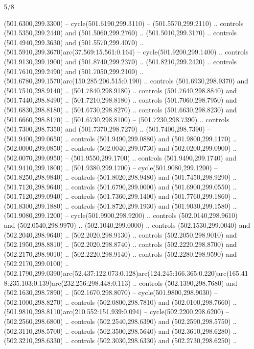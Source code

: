 \begin{flagdescription}{5/8}
\begin{scope}[xshift=0.5\flaglength,yshift=0.5\flagwidth,scale=\flagwidth/475.63]
\begin{scope}[y=0.8pt, x=0.8pt, yscale=-1, xscale=1,shift={(-450,-300)}]
\begin{scope}[cm={{1.0,0.0,0.0,1.0,(-0.0002,0.12556)}},cm={{1.0,0.0,0.0,1.0,(0.00179,0.0)}}]
\begin{scope}[cm={{1.11592,0.0,0.0,1.11592,(-106.89933,-41.77764)}}]
\begin{scope}[draw=black,fill=cfff]
\begin{scope}[fill=black]
  (501.6300,299.3300) -- cycle(501.6190,299.3110) -- (501.5570,299.2110) ..
  controls (501.5350,299.2440) and (501.5060,299.2760) .. (501.5010,299.3170) ..
  controls (501.4940,299.3630) and (501.5570,299.4070) ..
  (501.5910,299.3670)arc(37.569:15.561:0.164) -- cycle(501.9200,299.1400) ..
  controls (501.9130,299.1900) and (501.8740,299.2370) .. (501.8210,299.2420) ..
  controls (501.7610,299.2490) and (501.7050,299.2100) ..
  (501.6780,299.1570)arc(150.285:206.515:0.190) .. controls (501.6930,298.9370)
  and (501.7510,298.9140) .. (501.7840,298.9180) .. controls (501.7640,298.8840)
  and (501.7440,298.8490) .. (501.7210,298.8180) .. controls (501.7060,298.7950)
  and (501.6830,298.8180) .. (501.6730,298.8270) .. controls (501.6630,298.8230)
  and (501.6660,298.8170) .. (501.6730,298.8100) -- (501.7230,298.7390) ..
  controls (501.7300,298.7350) and (501.7370,298.7270) .. (501.7400,298.7390) --
  (501.9400,299.0650) .. controls (501.9490,299.0880) and (501.9800,299.1170) ..
  (502.0000,299.0850) .. controls (502.0040,299.0730) and (502.0200,299.0900) ..
  (502.0070,299.0950) -- (501.9550,299.1700) .. controls (501.9490,299.1740) and
  (501.9410,299.1800) .. (501.9380,299.1700) -- cycle(501.9080,299.1200) --
  (501.8250,298.9840) .. controls (501.8020,298.9480) and (501.7450,298.9290) ..
  (501.7120,298.9640) .. controls (501.6790,299.0000) and (501.6900,299.0550) ..
  (501.7120,299.0940) .. controls (501.7360,299.1400) and (501.7760,299.1860) ..
  (501.8300,299.1880) .. controls (501.8720,299.1930) and (501.9030,299.1580) ..
  (501.9080,299.1200) -- cycle(501.9900,298.9200) .. controls
  (502.0140,298.9610) and (502.0540,298.9970) .. (502.1040,299.0000) .. controls
  (502.1530,299.0040) and (502.2040,298.9640) .. (502.2020,298.9130) .. controls
  (502.2050,298.9010) and (502.1950,298.8810) .. (502.2020,298.8740) .. controls
  (502.2220,298.8700) and (502.2170,298.9010) .. (502.2220,298.9140) .. controls
  (502.2280,298.9590) and (502.2170,299.0100) ..
  (502.1790,299.0390)arc(52.437:122.073:0.128)arc(124.245:166.365:0.220)arc(165.418:235.103:0.139)arc(232.256:298.448:0.113)
  .. controls (502.1390,298.7680) and (502.1630,298.7890) .. (502.1670,298.8070)
  -- cycle(501.9800,298.9030) -- (502.1000,298.8270) .. controls
  (502.0800,298.7810) and (502.0100,298.7660) ..
  (501.9810,298.8110)arc(210.552:151.939:0.094) -- cycle(502.2200,298.6200) --
  (502.2560,298.6800) .. controls (502.2540,298.6390) and (502.2590,298.5750) ..
  (502.3110,298.5700) .. controls (502.3500,298.5640) and (502.3610,298.6280) ..
  (502.3210,298.6330) .. controls (502.3030,298.6330) and (502.2730,298.6250) ..

\end{scope}
\end{scope}
\end{scope}
\end{scope}
\end{scope}
\end{scope}
\end{flagdescription}
